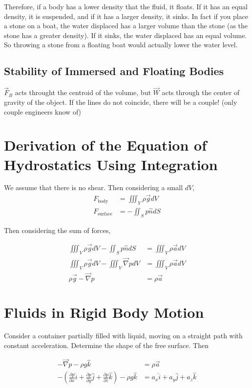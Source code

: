 \documentclass[12pt]{article}
\begin{document}
Therefore, if a body has a lower density that the fluid, it floats. If it has an equal density, it is suspended, and if it has a larger density, it sinks. In fact if you place a stone on a boat, the water displaced has a larger volume than the stone (as the stone has a greater density). If it sinks, the water displaced has an equal volume. So throwing a stone from a floating boat would actually lower the water level.

\subsection{Stability of Immersed and Floating Bodies}
$\vec{F}_B$ acts throught the centroid of the volume, but $\vec{W}$ acts through the center of gravity of the object. If the lines do not coincide, there will be a couple! (only couple engineers know of)

\section{Derivation of the Equation of Hydrostatics Using Integration}

We assume that there is no shear. Then considering a small $dV$,
\begin{align*}
	F_{\text{body}} &= \iiint_V \rho \vec{g}dV \\
	F_{\text{surface}} &= -\iint_S p\hat{n}dS
\end{align*}

Then considering the sum of forces,

\begin{align*}
	\iiint_V \rho \vec{g}dV - \iint_S p\hat{n}dS &= \iiint_V \rho \vec{a}dV \\
	\iiint_V\rho \vec{g}dV - \iiint_V\vec{\nabla}pdV &= \iiint_V \rho \vec{a}dV \\
	\rho \vec{g} - \vec{\nabla}p &= \rho\vec{a}
\end{align*}

\section{Fluids in Rigid Body Motion}

Consider a container partially filled with liquid, moving on a straight path with constant acceleration. Determine the shape of the free surface. Then

\begin{align*}
	-\vec{\nabla}p - \rho g\hat{k} &= \rho\vec{a} \\
	-\left(\frac{\partial p}{\partial x}\hat{i} + \frac{\partial p}{\partial y}\hat{j} + \frac{\partial p}{\partial z}\hat{k}\right) -\rho g\hat{k} &= a_x\hat{i} + a_y\hat{j} + a_z\hat{k}
\end{align*}
\end{document}

